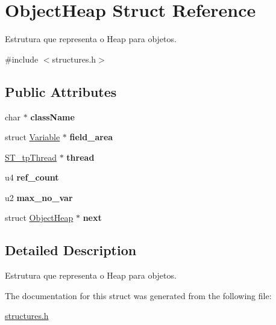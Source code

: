 \hypertarget{structObjectHeap}{}\section{Object\+Heap Struct Reference}
\label{structObjectHeap}


Estrutura que representa o Heap para objetos.  




{\ttfamily \#include $<$structures.\+h$>$}

\subsection*{Public Attributes}
\begin{DoxyCompactItemize}
\item 
\mbox{\label{structObjectHeap_ae8bd27e9081b7d691a510b091b25eb2c}} 
char $\ast$ {\bfseries class\+Name}
\item 
\mbox{\label{structObjectHeap_a173aa478fab6c6681b8f86fd0fc17e1f}} 
struct \mbox{\hyperlink{structVariable}{Variable}} $\ast$ {\bfseries field\+\_\+area}
\item 
\mbox{\label{structObjectHeap_a8da6bad3d08ca9569f872971a094b44b}} 
\mbox{\hyperlink{structures_8h_afd892ddd9ad4b7f9600350a3d42d683e}{S\+T\+\_\+tp\+Thread}} $\ast$ {\bfseries thread}
\item 
\mbox{\label{structObjectHeap_abc33258f65d3c56a8bc473b55ed228b5}} 
u4 {\bfseries ref\+\_\+count}
\item 
\mbox{\label{structObjectHeap_a71613e5f1888f010095c0a130ede336a}} 
u2 {\bfseries max\+\_\+no\+\_\+var}
\item 
\mbox{\label{structObjectHeap_aacbee22a84d75d2f94e8ef3cee7ca602}} 
struct \mbox{\hyperlink{structObjectHeap}{Object\+Heap}} $\ast$ {\bfseries next}
\end{DoxyCompactItemize}


\subsection{Detailed Description}
Estrutura que representa o Heap para objetos. 

The documentation for this struct was generated from the following file\+:\begin{DoxyCompactItemize}
\item 
\mbox{\hyperlink{structures_8h}{structures.\+h}}\end{DoxyCompactItemize}
